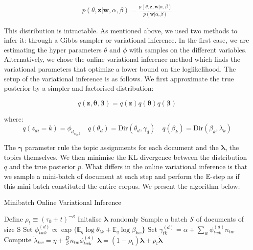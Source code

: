 \documentclass[twoside]{article}
\begin{document}
\begin{multicols}{2}
\begin{align*}
p(\theta, \mathbf{z} |\mathbf{w}, \alpha, \beta) = \frac{p(\theta, \mathbf{z}, \mathbf{w} | \alpha, \beta)}{p(\mathbf{w} | \alpha, \beta)}
\end{align*}

\noindent This distribution is intractable. As mentioned above, we used two  methods to infer it: through a Gibbs sampler or variational inference. In the first case, we are estimating the hyper parameters $\theta$ and $\phi$ with samples on the different variables. Alternatively, we chose the online variational inference method which finds the variational parameters that optimize a lower bound on the loglikelihood. The setup \cite{OLLD} of the variational inference is as follows. We first approximate the true posterior by a simpler and factorised distribution:

$$q(\boldsymbol{z},\boldsymbol{\theta},\boldsymbol{\beta}) = q(\boldsymbol{z})q(\boldsymbol{\theta})q(\boldsymbol{\beta}) $$ 

\noindent where:
$$ q(z_{di} = k) = \phi_{d_{w_{di}k}} \quad q(\theta_d) = \text{Dir}(\theta_d,\gamma_d) \quad q(\beta_k) = \text{Dir}(\beta_k,\lambda_k) $$

\noindent The $\boldsymbol{\gamma}$ parameter rule the topic assignments for each document and the $\boldsymbol{\lambda}$, the topics themselves. We then minimise the KL divergence between the distribution $q$ and the true posterior $p$. What differs in the online variational inference is that we sample a mini-batch of document at each step and perform the E-step as if this mini-batch constituted the entire corpus. We present the algorithm below:

\begin{algorithm}[H]
\caption{Minibatch Online Variational Inference}\label{euclid}
\begin{algorithmic}[1]
\State Define $\rho_t \equiv (\tau_0 + t)^{-\kappa}$
\State Initalise $\boldsymbol{\lambda}$ randomly
\State Sample a batch $\mathcal{S}$ of documents of size S
\State Set $\phi^{(d)}_{twk} \propto \exp\{\mathbb{E}_q\log\theta_{tk} + \mathbb{E}_q\log\beta_{kw}\}$
\State Set $\gamma^{(d)}_{tk} = \alpha + \sum_{w} \phi^{(d)}_{twk}n_{tw}$
\EndWhile
\State Compute $\tilde{\lambda}_{kw} = \eta +\frac{D}{S}n_{tw}\phi^{(d)}_{twk}$
\EndFor
\State $\boldsymbol{\lambda} = (1-\rho_t)\boldsymbol{\lambda}+\rho_t\boldsymbol{\tilde{\lambda}}$
\EndFor
\end{algorithmic}
\end{algorithm}


\end{multicols}
\end{document}
